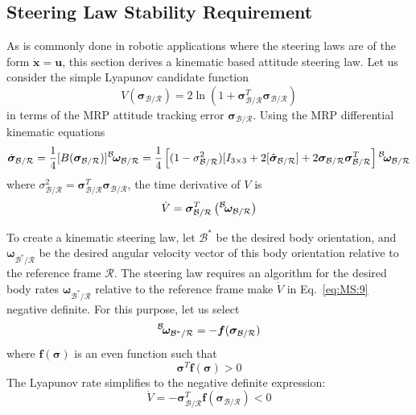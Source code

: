 \documentclass[]{AVSSimReportMemo}
\begin{document}
\subsection{Steering Law Stability Requirement}
As is commonly done in robotic applications where the steering laws are of the form $\dot{\bm x} = \bm u$, this section derives a kinematic based attitude steering law.  Let us consider the simple Lyapunov candidate function\cite{Tsiotras:1994lr,schaub}
\begin{equation}
	\label{eq:MS:7}
	V ( \bm\sigma_{\mathcal{B}/\mathcal{R}} ) = 2 \ln \left ( 1 + \bm\sigma_{\mathcal{B}/\mathcal{R}} ^{T} \bm\sigma_{\mathcal{B}/\mathcal{R}} \right)
\end{equation}
in terms of the MRP attitude tracking error $\bm\sigma_{\mathcal{B}/\mathcal{R}}$.  Using the MRP differential kinematic equations
\begin{equation}
	\label{eq:MS:8}
	\dot{\bm\sigma}_{\mathcal{B}/\mathcal{R}} = \frac{1}{4}[B(\bm\sigma_{\mathcal{B}/\mathcal{R}})] \leftexp{B}{\bm\omega}_{\mathcal{B}/\mathcal{R}}
	= \frac{1}{4} \left[
	(1-\sigma_{\mathcal{B}/\mathcal{R}}^{2})[I_{3\times 3} + 2 [\tilde{\bm\sigma}_{\mathcal{B}/\mathcal{R}}] + 2 \bm\sigma_{\mathcal{B}/\mathcal{R}} \bm\sigma_{\mathcal{B}/\mathcal{R}}^{T}
	\right] \leftexp{B}{\bm\omega}_{\mathcal{B}/\mathcal{R}}
\end{equation}
where $\sigma_{\mathcal{B}/\mathcal{R}}^{2} = \bm\sigma_{\mathcal{B}/\mathcal{R}}^{T} \bm\sigma_{\mathcal{B}/\mathcal{R}}$, the time derivative of $V$ is
\begin{equation}
	\label{eq:MS:9}
	\dot V =\bm \sigma_{\mathcal{B}/\mathcal{R}}^{T} \left(  \leftexp{B}{ \bm\omega}_{\mathcal{B}/\mathcal{R}}  \right)
\end{equation}

To create a kinematic steering law, let ${\mathcal{B}}^{\ast}$ be the desired body orientation, and $\bm\omega_{{\mathcal{B}}^{\ast}/\mathcal{R}}$ be the desired angular velocity vector of this body orientation relative to the reference frame $\mathcal{R}$.  The steering law requires an algorithm for the desired body rates $\bm\omega_{{\mathcal{B}}^{\ast}/\mathcal{R}}$  relative to the reference frame make $\dot V$ in Eq.~\eqref{eq:MS:9} negative definite.  For this purpose, let us select
\begin{equation}
	\label{eq:MS:10}
	\leftexp{B}{\bm\omega}_{{\mathcal{B}}^{\ast}/\mathcal{R}} = - \bm f(\bm\sigma_{\mathcal{B}/\mathcal{R}})
\end{equation}
where $\bm f(\bm\sigma)$ is an even function such that 
\begin{equation}
	\label{eq:MS:11}
	\bm \sigma ^{T} \bm f(\bm \sigma) > 0
\end{equation}
The Lyapunov rate simplifies to the negative definite expression:
\begin{equation}
	\label{eq:MS:12}
	\dot V = -  \bm \sigma_{\mathcal{B}/\mathcal{R}}^{T} \bm f(\bm \sigma_{\mathcal{B}/\mathcal{R}}) < 0
\end{equation}
\end{document}
